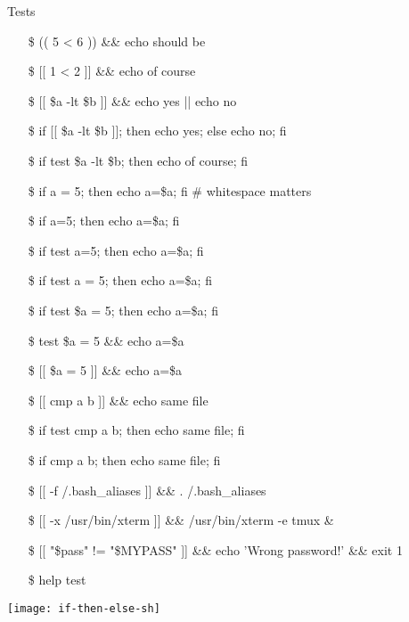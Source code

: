 \begin{frame}[allowframebreaks]{Tests}\small\ttfamily
  \begin{itemize}
  \item[\$] (( 5 < 6 )) \&\& echo should be
  \item[\$] [[ 1 < 2 ]] \&\& echo of course
  \item[\$] [[ \$a -lt \$b ]] \&\& echo yes || echo no
  \item[\$] if [[ \$a -lt \$b ]]; then echo yes; else echo no; fi
  \item[\$] if test \$a -lt \$b; then echo of course; fi
  \item[\$] if a = 5; then echo a=\$a; fi \# whitespace matters \wrong
  \item[\$] if a=5; then echo a=\$a; fi \Bad
  \item[\$] if test a=5; then echo a=\$a; fi \Bad
  \item[\$] if test a = 5; then echo a=\$a; fi \Bad
  \item[\$] if test \$a = 5; then echo a=\$a; fi \correct
  \item[\$] test \$a = 5 \&\& echo a=\$a \correct
  \item[\$] [[ \$a = 5 ]] \&\& echo a=\$a \correct
  \item[\$] [[ cmp a b ]] \&\& echo same file \wrong
  \item[\$] if test cmp a b; then echo same file; fi \wrong
  \item[\$] if cmp a b; then echo same file; fi \correct
  \item[\$] [[ -f \symbol{`~}/.bash\_aliases ]] \&\& . /.bash\_aliases
  \item[\$] [[ -x /usr/bin/xterm ]] \&\& /usr/bin/xterm -e tmux \&
  \item[\$] [[ "\$pass" != "\$MYPASS" ]] \&\& echo 'Wrong password!' \&\& exit 1
  \item[\$] help test
  \end{itemize}
  \begin{block}{}
    \begin{center}
      \texttt{[image: if-then-else-sh]}
    \end{center}
  \end{block}
\end{frame}

